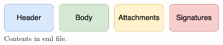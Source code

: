 \begin{figure}[H]
    \includegraphics[width=\linewidth]{figs/eml_contents.png}
    \caption{Contents in \ac{eml} file.}
    \label{fig:c2:eml_contents}
  \end{figure}
